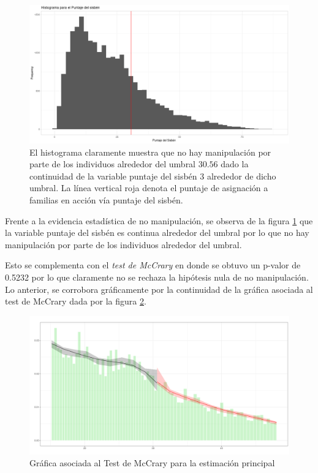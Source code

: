 \documentclass[AER]{AEA}
\begin{document}
\begin{figure}[h!]
    \centering
    \includegraphics[scale = 0.35]{imagenes/estimax_principal/histrograma_puntaje_sisben.png}
    \caption{El histograma claramente muestra que no hay manipulación por parte de los individuos alrededor del umbral $30.56$ dado la continuidad de la variable puntaje del sisbén 3 alrededor de dicho umbral. La línea vertical roja denota el puntaje de asignación a familias en acción vía puntaje del sisbén.}
    \label{fig:histog_completa}
\end{figure}

Frente a la evidencia estadística de no manipulación, se observa de la figura \ref{fig:histog_completa} que la variable puntaje del sisbén es continua alrededor del umbral por lo que no hay manipulación por parte de los individuos alrededor del umbral.

Esto se complementa con el \textit{test de McCrary} en donde se obtuvo un p-valor de 0.5232 por lo que claramente no se rechaza la hipótesis nula de no manipulación. Lo anterior, se corrobora gráficamente por la continuidad de la gráfica asociada al test de McCrary dada por la figura \ref{fig:mccrary_complete}. 

\begin{figure}[h!]
    \centering
    \includegraphics[scale = 0.35]{imagenes/estimax_principal/mccrary_principal.png}
    \caption{Gráfica asociada al Test de McCrary para la estimación principal}
    \label{fig:mccrary_complete}
\end{figure}
\end{document}
